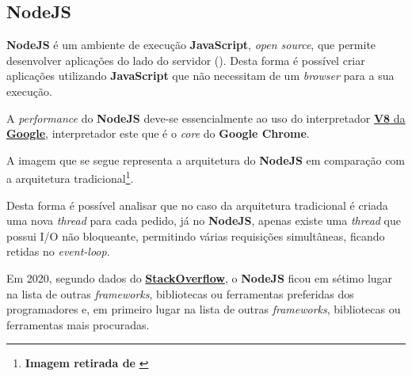 \subsection{NodeJS}

\begin{minipage}{.3\textwidth}
\end{minipage}
\begin{minipage}{.7\textwidth}
	\minipagerestore
	\textbf{NodeJS} é um ambiente de execução \textbf{JavaScript}, \textit{open source}, que permite desenvolver aplicações do lado do servidor (). Desta forma é possível criar aplicações utilizando \textbf{JavaScript} que não necessitam de um \textit{browser} para a sua execução.

	A \textit{performance} do \textbf{NodeJS} deve-se essencialmente ao uso do interpretador \href{https://v8.dev}{\textbf{V8} da \textbf{Google}}, interpretador este que é o \textit{core} do \textbf{Google Chrome}.

\end{minipage}

A imagem que se segue representa a arquitetura do \textbf{NodeJS} em comparação com a arquitetura tradicional\footnote{\textbf{Imagem retirada de} \cite{caseByCaseNode}}.


Desta forma é possível analisar que no caso da arquitetura tradicional é criada uma nova \textit{thread} para cada pedido, já no \textbf{NodeJS}, apenas existe uma \textit{thread} que possui I/O não bloqueante, permitindo várias requisições simultâneas, ficando retidas no \textit{event-loop}.

Em 2020, segundo dados do \href{https://insights.stackoverflow.com/survey/2020#technology-most-loved-dreaded-and-wanted-other-frameworks-libraries-and-tools-loved3}{\textbf{StackOverflow}}, o \textbf{NodeJS} ficou em sétimo lugar na lista de outras \textit{frameworks}, bibliotecas ou ferramentas preferidas dos programadores e, em primeiro lugar na lista de outras \textit{frameworks}, bibliotecas ou ferramentas mais procuradas.

